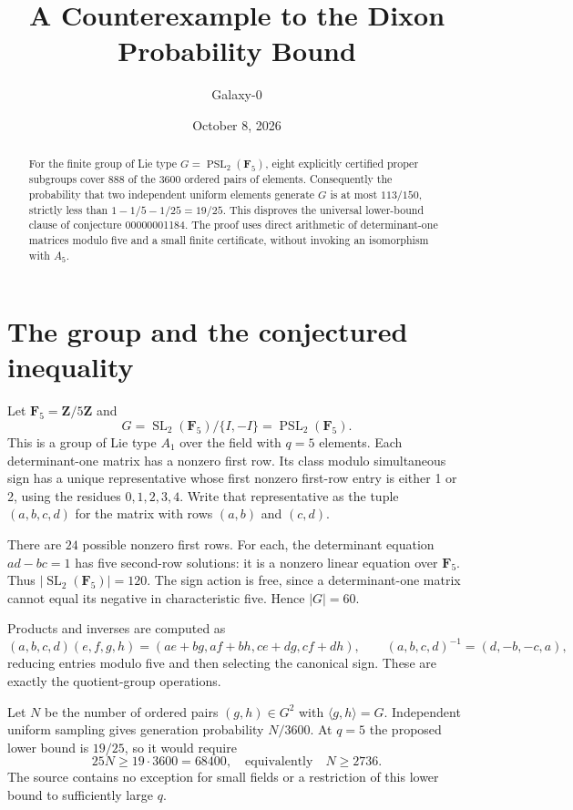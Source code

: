 \documentclass[10pt]{article}
\title{A Counterexample to the Dixon Probability Bound}
\author{Galaxy-0}
\date{October 8, 2026}
\begin{document}
\maketitle
\begin{abstract}
For the finite group of Lie type $G=\operatorname{PSL}_2(\mathbf F_5)$, eight explicitly certified proper subgroups cover 888 of the 3600 ordered pairs of elements. Consequently the probability that two independent uniform elements generate $G$ is at most $113/150$, strictly less than $1-1/5-1/25=19/25$. This disproves the universal lower-bound clause of conjecture 00000001184. The proof uses direct arithmetic of determinant-one matrices modulo five and a small finite certificate, without invoking an isomorphism with $A_5$.
\end{abstract}
\section{The group and the conjectured inequality}
Let $\mathbf F_5=\mathbf Z/5\mathbf Z$ and
\[
G=\operatorname{SL}_2(\mathbf F_5)/\{I,-I\}
 =\operatorname{PSL}_2(\mathbf F_5).
\]
This is a group of Lie type $A_1$ over the field with $q=5$ elements. Each determinant-one matrix has a nonzero first row. Its class modulo simultaneous sign has a unique representative whose first nonzero first-row entry is either 1 or 2, using the residues $0,1,2,3,4$. Write that representative as the tuple $(a,b,c,d)$ for the matrix with rows $(a,b)$ and $(c,d)$.

There are $24$ possible nonzero first rows. For each, the determinant equation $ad-bc=1$ has five second-row solutions: it is a nonzero linear equation over $\mathbf F_5$. Thus $|\operatorname{SL}_2(\mathbf F_5)|=120$. The sign action is free, since a determinant-one matrix cannot equal its negative in characteristic five. Hence $|G|=60$.

Products and inverses are computed as
\[
(a,b,c,d)(e,f,g,h)=(ae+bg,af+bh,ce+dg,cf+dh),
\qquad (a,b,c,d)^{-1}=(d,-b,-c,a),
\]
reducing entries modulo five and then selecting the canonical sign. These are exactly the quotient-group operations.

Let $N$ be the number of ordered pairs $(g,h)\in G^2$ with $\langle g,h\rangle=G$. Independent uniform sampling gives generation probability $N/3600$. At $q=5$ the proposed lower bound is $19/25$, so it would require
\[
25N\ge19\cdot3600=68400,
\quad\text{equivalently}\quad N\ge2736.
\]
The source contains no exception for small fields or a restriction of this lower bound to sufficiently large $q$.
\end{document}
